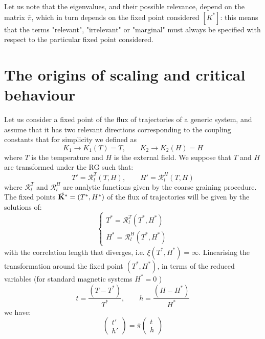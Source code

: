 \documentclass[../../Main/Main.tex]{subfiles}
\begin{document}
\begin{remark}
Let us note that the eigenvalues, and their possible relevance, depend on the matrix \( \bar{\pi }  \), which in turn depends on the fixed point considered \( [K^*] \): this means that the terms "relevant", "irrelevant" or "marginal" must always be specified with respect to the particular fixed point considered.
\end{remark}


\section{The origins of scaling and critical behaviour}
Let us consider a fixed point of the flux of trajectories of a generic system, and assume that it has two relevant directions corresponding to the coupling constants that for simplicity we defined as
\begin{equation*}
  K_1 \rightarrow K_1 (T) = T, \qquad K_2 \rightarrow K_2 (H) = H
\end{equation*}
where \( T \) is the temperature and \( H \) is the external field.  We suppose that
\( T \) and \( H \)  are transformed under the RG such that:
\begin{equation*}
  T' = \mathcal{R}_l ^T (T,H), \qquad H' = \mathcal{R}_l ^H (T,H)
\end{equation*}
where \( \mathcal{R}_l ^T  \) and \( \mathcal{R}_l ^H  \) are analytic functions given by the coarse graining procedure.  The fixed points \( \va{K}^* = (T^*,H^*) \)  of the flux of trajectories will be given by the solutions of:
\begin{equation*}
  \begin{cases}
   T^* = \mathcal{R}_l ^T (T^*,H^*)\\
   H^* = \mathcal{R}_l ^H (T^*,H^*)
  \end{cases}
\end{equation*}
with the correlation length that diverges, i.e. \( \xi (T^*,H^*) = \infty  \).
Linearising the transformation around the fixed point \( (T^*,H^*) \), in terms of the reduced variables (for standard magnetic systems \( H^*=0 \) )
\begin{equation*}
  t = \frac{(T-T^*)}{T^*}, \qquad h = \frac{(H-H^*)}{H^*}
\end{equation*}
we have:
\begin{equation}
  \begin{pmatrix}
  t' \\
  h'
  \end{pmatrix}
  = \bar{\pi }
  \begin{pmatrix}
  t \\
  h
  \end{pmatrix}
\end{equation}
\end{document}
